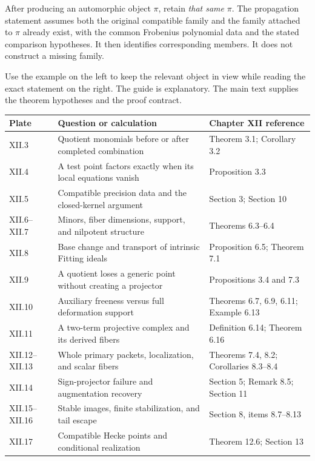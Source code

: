 After producing an automorphic object $\pi$, retain \emph{that same} $\pi$. The propagation statement assumes both the original compatible family and the family attached to $\pi$ already exist, with the common Frobenius polynomial data and the stated comparison hypotheses. It then identifies corresponding members. It does not construct a missing family.


Use the example on the left to keep the relevant object in view while reading the exact statement on the right. The guide is explanatory. The main text supplies the theorem hypotheses and the proof contract.

{\small
\begin{tabularx}{\linewidth}{@{}p{.12\linewidth}Yp{.30\linewidth}@{}}\toprule
\textbf{Plate} & \textbf{Question or calculation} & \textbf{Chapter XII reference}\\\midrule
XII.3 & Quotient monomials before or after completed combination & Theorem 3.1; Corollary 3.2\\
XII.4 & A test point factors exactly when its local equations vanish & Proposition 3.3\\
XII.5 & Compatible precision data and the closed-kernel argument & Section 3; Section 10\\
XII.6--XII.7 & Minors, fiber dimensions, support, and nilpotent structure & Theorems 6.3--6.4\\
XII.8 & Base change and transport of intrinsic Fitting ideals & Proposition 6.5; Theorem 7.1\\
XII.9 & A quotient loses a generic point without creating a projector & Propositions 3.4 and 7.3\\
XII.10 & Auxiliary freeness versus full deformation support & Theorems 6.7, 6.9, 6.11; Example 6.13\\
XII.11 & A two-term projective complex and its derived fibers & Definition 6.14; Theorem 6.16\\
XII.12--XII.13 & Whole primary packets, localization, and scalar fibers & Theorems 7.4, 8.2; Corollaries 8.3--8.4\\
XII.14 & Sign-projector failure and augmentation recovery & Section 5; Remark 8.5; Section 11\\
XII.15--XII.16 & Stable images, finite stabilization, and tail escape & Section 8, items 8.7--8.13\\
XII.17 & Compatible Hecke points and conditional realization & Theorem 12.6; Section 13\\\bottomrule
\end{tabularx}}


